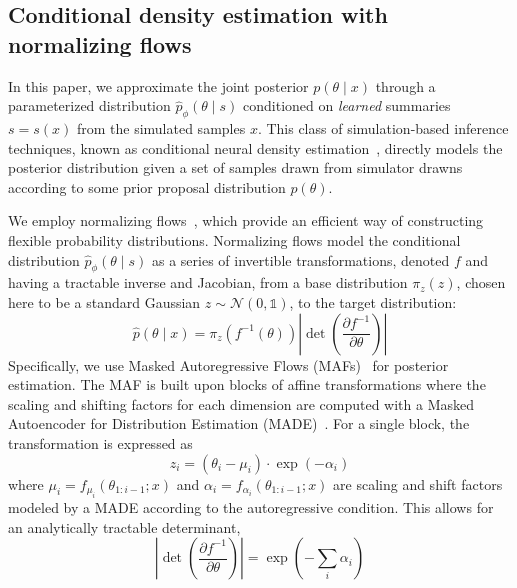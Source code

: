 \documentclass[prd,aps,10pt,nofootinbib,twocolumn,superscriptaddress,preprintnumbers,balancelastpage,longbibliography]{revtex4-1}
\begin{document}
\subsection{Conditional density estimation with normalizing flows}

In this paper, we approximate the joint posterior $p(\theta\mid x)$ through a parameterized distribution $\hat p_\phi(\theta\mid s)$ conditioned on \emph{learned} summaries $s=s(x)$ from the simulated samples $x$. This class of simulation-based inference techniques, known as conditional neural density estimation~\cite{papamakariosFastEpsilonFree2018}, directly models the posterior distribution given a set of samples drawn from simulator drawns according to some prior proposal distribution $p(\theta)$.

We employ normalizing flows~\cite{papamakarios2019normalizing,rezende2015variational}, which provide an efficient way of constructing flexible probability distributions. Normalizing flows model the conditional distribution $\hat p_\phi(\theta\mid s)$ as a series of invertible transformations, denoted $f$ and having a tractable inverse and Jacobian, from a base distribution $\pi_z({z})$, chosen here to be a standard Gaussian $z\sim \mathcal N(0, \mathbb{1})$, to the target distribution:
\begin{equation}
    \hat{p}({\theta} \mid {x})=\pi_{z}\left(f^{-1}({\theta})\right)\left|\operatorname{det}\left(\frac{\partial f^{-1}}{\partial {\theta}}\right)\right|
\end{equation}
Specifically, we use Masked Autoregressive Flows (MAFs)~\cite{10.5555/3294771.3294994} for posterior estimation. The MAF is built upon blocks of affine transformations where the scaling and shifting factors for each dimension are computed with a Masked Autoencoder for Distribution Estimation (MADE)~\cite{germain2015made}. For a single block, the transformation is expressed as 
\begin{equation}
    \label{eq:maf_z}
    z_{i}=\left(\theta_{i}-\mu_{i}\right) \cdot \exp \left(-\alpha_{i}\right)
\end{equation}
where $\mu_{i}=f_{\mu_{i}}\left({\theta}_{1: i-1} ; {x}\right)$ and $\alpha_i = f_{\alpha_{i}}\left({\theta}_{1: i-1} ; {x}\right)$ are scaling and shift factors modeled by a MADE according to the autoregressive condition. This allows for an analytically tractable determinant,
\begin{equation}
    \label{eq:det}
    \left|\operatorname{det}\left(\frac{\partial f^{-1}}{\partial {\theta}}\right)\right|=\exp \left(-\sum_{i} \alpha_{i}\right)
\end{equation}
\end{document}
